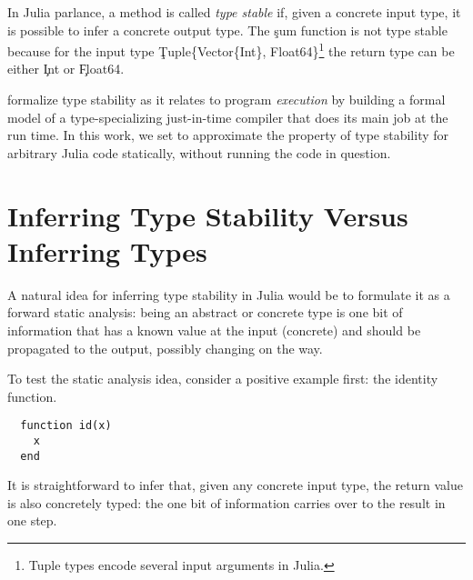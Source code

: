\documentclass[sigplan,screen]{acmart}
\begin{document}
In Julia parlance, a method is called \emph{type stable} if, given a concrete
input type, it is possible to infer a concrete output type. The \c{sum} function
is not type stable because for the input type \c{Tuple\{Vector\{Int\},
Float64\}}\footnote{Tuple types encode several input arguments in Julia.}
the return type can be either \c{Int} or \c{Float64}.

\citet{Pelenitsyn21} formalize type stability as it
relates to program \emph{execution} by building a formal model of a
type-specializing just-in-time compiler that does its main job at the run time.
In this work, we set to approximate the property of type stability for
arbitrary Julia code statically, without running the code in question.

\section{Inferring Type Stability Versus Inferring Types}%
\label{sec:arrive}

A natural idea for inferring type stability in Julia would be to formulate it as
a forward static analysis: being an abstract or concrete type is one bit of
information that has a known value at the input (concrete) and should be
propagated to the output, possibly changing on the way.

To test the static analysis idea, consider a positive example first: the
identity function.
\begin{verbatim}
  function id(x)
    x
  end
\end{verbatim}
%
It is straightforward to infer that, given any concrete input type, the return
value is also concretely typed: the one bit of information carries over to the
result in one step.
\end{document}
